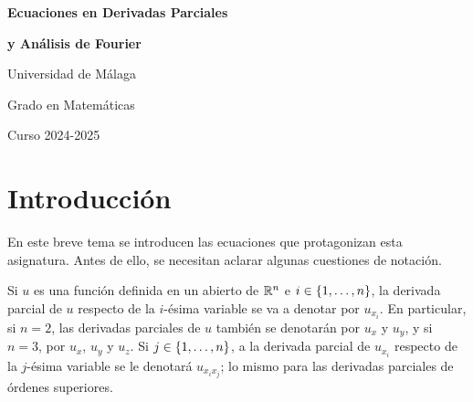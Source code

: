 \documentclass[a4paper, 12pt, extrafontsizes]{memoir}
\begin{document}
\begin{titlingpage*}

    \vspace*{0.5cm}
  
    
    \centering
    
    \vspace{\baselineskip}

    {\fontsize{27.5pt}{0pt}\selectfont\textbf{\color{white}Ecuaciones en Derivadas Parciales}}

    \vspace{\baselineskip}

    {\fontsize{27.5pt}{0pt}\selectfont\textbf{\color{white}y Análisis de Fourier}}

    \vspace{5\baselineskip}
    
    {\color{black}\itshape\bfseries{
    
    Universidad de Málaga

    \vspace{0.5\baselineskip}
    
    Grado en Matemáticas
    
    \vspace{0.5\baselineskip}

    Curso 2024-2025
    
    }}
    
\end{titlingpage*}
  
\tableofcontents*
\thispagestyle{empty}  

\chapter{Introducción}

En este breve tema se introducen las ecuaciones que protagonizan esta asignatura. Antes de ello, se necesitan aclarar algunas cuestiones de notación.

Si $u$ es una función definida en un abierto de $\mathbb R^n$ e $i \in \{1,\mathellipsis,n\}$, la derivada parcial de $u$ respecto de la $i$-ésima variable se va a denotar por $u_{x_i}$. En particular, si $n = 2$, las derivadas parciales de $u$ también se denotarán por $u_x$ y $u_y$, y si $n = 3$, por $u_x$, $u_y$ y $u_z$. Si $j \in \{1,\mathellipsis,n\}$, a la derivada parcial de $u_{x_i}$ respecto de la $j$-ésima variable se le denotará $u_{x_ix_j}$; lo mismo para las derivadas parciales de órdenes superiores.
\end{document}
